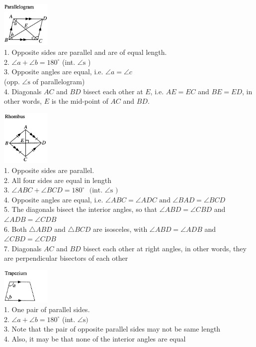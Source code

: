 \documentclass[twocolumn]{article}
\begin{document}
\begin{enumerate}
\bigskip

\includegraphics[width=0.175\textwidth]{30.png} \\
1. Opposite sides are parallel and are of equal length. \\
2. $\angle a+\angle b=180^{\circ}$ (int. $\angle \mathrm{s}$ ) \\
3. Opposite angles are equal, i.e. $\angle a=\angle c$ \\
(opp. $\angle \mathrm{s}$ of parallelogram) \\
4. Diagonals $A C$ and $B D$ bisect each other at $E$, i.e. 
$A E=E C$ and $B E=E D$, in other words, $E$ is the mid-point of $AC$ and $BD$.

\bigskip

\includegraphics[width=0.175\textwidth]{33.png} \\
1. Opposite sides are parallel. \\
2. All four sides are equal in length \\
3. $\angle A B C+\angle B C D = 180^{\circ}$ $\text { (int. } \angle \mathrm{s} \text { ) }$ \\
4. Opposite angles are equal, i.e. $\angle A B C=\angle A D C  \text { and } \angle B A D=\angle B C D$ \\
5. The diagonals bisect the interior angles, so that $\angle A B D = \angle C B D$ and $\angle A D B = \angle C D B$ \\
6. Both $\triangle A B D$ and $\triangle B C D$ are isosceles, with $\angle A B D=\angle A D B$ and $\angle C B D=\angle C D B$ \\
7. Diagonals $A C$ and $B D$ bisect each other at right angles, in other words, they are perpendicular bisectors of each other

\bigskip

\includegraphics[width=0.175\textwidth]{31.png} \\
1. One pair of parallel sides. \\
2. $\angle a+\angle b=180^{\circ}$	(int. $\angle \mathrm{s})$ \\
3. Note that the pair of opposite parallel sides may not be same length\\
4. Also, it may be that none of the interior angles are equal


\end{enumerate}
\end{document}
